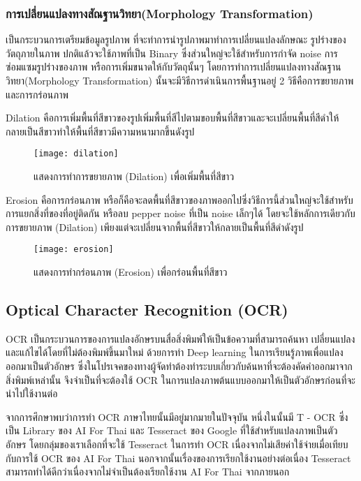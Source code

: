 \subsubsection{การเปลี่ยนแปลงทางสัณฐานวิทยา(Morphology Transformation)}

เป็นกระบวนการเตรียมข้อมูลรูปภาพ  ที่จะทำการนำรูปภาพมาทำการเปลี่ยนแปลงลักษณะ รูปร่างของวัตถุภายในภาพ ปกติแล้วจะใช้ภาพที่เป็น Binary ซึ่งส่วนใหญ่จะใช้สำหรับการกำจัด noise การซ่อมแซมรูปร่างของภาพ หรือการเพิ่มขนาดให้กับวัตถุนั้นๆ โดยการทำการเปลี่ยนแปลงทางสัณฐานวิทยา(Morphology Transformation) นั้นจะมีวิธีการดำเนินการพื้นฐานอยู่ 2 วิธีคือการขยายภาพ และการกร่อนภาพ

Dilation คือการเพิ่มพื้นที่สีขาวของรูปเพิ่มพื้นที่สีไปตามขอบพื้นที่สีขาวและจะเปลี่ยนพื้นที่สีดำให้กลายเป็นสีขาวทำให้พื้นที่สีขาวมีความหนามากขึ้นดังรูป 

\begin{figure}[H]
    \centering
    \texttt{[image: dilation]}
    \caption{แสดงการทำการขยายภาพ  (Dilation) เพื่อเพิ่มพื้นที่สีขาว}\label{fig:Dilation}
\end{figure}

Erosion คือการกร่อนภาพ หรือก็คือจะลดพื้นที่สีขาวของภาพออกไปซึ่งวิธีการนี้ส่วนใหญ่จะใช้สำหรับการแยกสิ่งที่ของที่อยู่ติดกัน หรือลบ pepper noise ที่เป็น noise เล็กๆได้ โดยจะใช้หลักการเดียวกับการขยายภาพ  (Dilation) เพียงแต่จะเปลี่ยนจากพื้นที่สีขาวให้กลายเป็นพื้นที่สีดำดังรูป

\begin{figure}[H]
    \centering
    \texttt{[image: erosion]}
    \caption{แสดงการทำกร่อนภาพ (Erosion) เพื่อกร่อนพื้นที่สีขาว}\label{fig:Erosion}
\end{figure}

\subsection{Optical Character Recognition (OCR)}

OCR เป็นกระบวนการของการแปลงอักษรบนสื่อสิ่งพิมพ์ให้เป็นข้อความที่สามารถค้นหา เปลี่ยนแปลงและแก้ไขได้โดยที่ไม่ต้องพิมพ์ขึ้นมาใหม่ ด้วยการทำ Deep learning ในการเรียนรู้ภาพเพื่อแปลงออกมาเป็นตัวอักษร ซึ่งในโปรเจคของทางผู้จัดทำต้องทำระบบเกี่ยวกับค้นหาที่จะต้องคัดคำออกมาจากสิ่งพิมพ์เหล่านั้น จึงจำเป็นที่จะต้องใช้ OCR ในการแปลงภาพต้นแบบออกมาให้เป็นตัวอักษรก่อนที่จะนำไปใช้งานต่อ

จากการศึกษาพบว่าการทำ OCR ภาษาไทยนั้นมีอยู่มากมายในปัจจุบัน หนึ่งในนั้นมี T - OCR ซึ่งเป็น Library ของ AI For Thai \cite{nectec} และ Tesseract ของ Google \cite{google} ที่ใช้สำหรับแปลงภาพเป็นตัวอักษร โดยกลุ่มของเราเลือกที่จะใช้ Tesseract ในการทำ OCR เนื่องจากไม่เสียค่าใช้จ่ายเมื่อเทียบกับการใช้ OCR ของ AI For Thai นอกจากนั้นเรื่องของการเรียกใช้งานอย่างต่อเนื่อง Tesseract สามารถทำได้ดีกว่าเนื่องจากไม่จำเป็นต้องเรียกใช้งาน AI For Thai จากภายนอก

